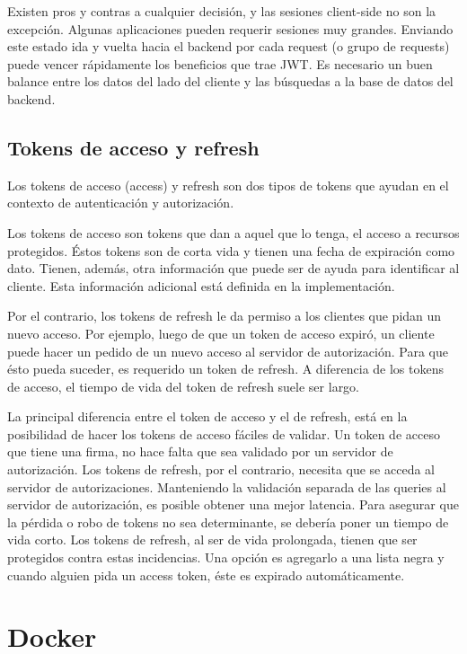 Existen pros y contras a cualquier decisión, y las sesiones client-side no son la excepción. Algunas aplicaciones pueden requerir sesiones muy grandes. Enviando este estado ida y vuelta hacia el backend por cada request (o grupo de requests) puede vencer rápidamente los beneficios que trae JWT. Es necesario un buen balance entre los datos del lado del cliente y las búsquedas a la base de datos del backend.

\subsection[Tokens de acceso y refresh]{Tokens de acceso y refresh}

Los tokens de acceso (access) y refresh son dos tipos de tokens que ayudan en el contexto de autenticación y autorización.

Los tokens de acceso son tokens que dan a aquel que lo tenga, el acceso a recursos protegidos. Éstos tokens son de corta vida y tienen una fecha de expiración como dato. Tienen, además, otra información que puede ser de ayuda para identificar al cliente. Esta información adicional está definida en la implementación.

Por el contrario, los tokens de refresh le da permiso a los clientes que pidan un nuevo acceso. Por ejemplo, luego de que un token de acceso expiró, un cliente puede hacer un pedido de un nuevo acceso al servidor de autorización. Para que ésto pueda suceder, es requerido un token de refresh.
A diferencia de los tokens de acceso, el tiempo de vida del token de refresh suele ser largo.

La principal diferencia entre el token de acceso y el de refresh, está en la posibilidad de hacer los tokens de acceso fáciles de validar. Un token de acceso que tiene una firma, no hace falta que sea validado por un servidor de autorización.
Los tokens de refresh, por el contrario, necesita que se acceda al servidor de autorizaciones. Manteniendo la validación separada de las queries al servidor de autorización, es posible obtener una mejor latencia.
Para asegurar que la pérdida o robo de tokens no sea determinante, se debería poner un tiempo de vida corto.
Los tokens de refresh, al ser de vida prolongada, tienen que ser protegidos contra estas incidencias. 
Una opción es agregarlo a una lista negra y cuando alguien pida un access token, éste es expirado automáticamente.

\section[Docker]{Docker}

